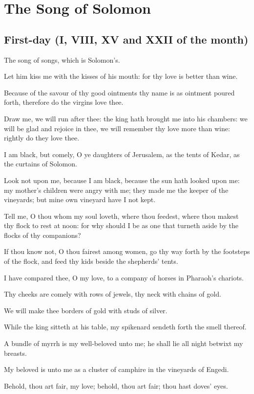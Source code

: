 \chapter*{The Song of Solomon}

\section*{First-day (I, VIII, XV and XXII of the month)}

The song of songs, which is Solomon's.

Let him kiss me with the kisses of his mouth: for thy love is better than wine.

Because of the savour of thy good ointments thy name is as ointment poured forth, therefore do the virgins love thee.

 Draw me, we will run after thee: the king hath brought me into his chambers: we will be glad and rejoice in thee, we will remember thy love more than wine: rightly do they love thee.

I am black, but comely, O ye daughters of Jerusalem, as the tents of Kedar, as the curtains of Solomon.

Look not upon me, because I am black, because the sun hath looked upon me: my mother's children were angry with me; they made me the keeper of the vineyards; but mine own vineyard have I not kept.

Tell me, O thou whom my soul loveth, where thou feedest, where thou makest thy flock to rest at noon: for why should I be as one that turneth aside by the flocks of thy companions?

If thou know not, O thou fairest among women, go thy way forth by the footsteps of the flock, and feed thy kids beside the shepherds' tents.

I have compared thee, O my love, to a company of horses in Pharaoh's chariots.

Thy cheeks are comely with rows of jewels, thy neck with chains of gold.

We will make thee borders of gold with studs of silver.

While the king sitteth at his table, my spikenard sendeth forth the smell thereof.

A bundle of myrrh is my well-beloved unto me; he shall lie all night betwixt my breasts.

My beloved is unto me as a cluster of camphire in the vineyards of Engedi.

Behold, thou art fair, my love; behold, thou art fair; thou hast doves' eyes.


